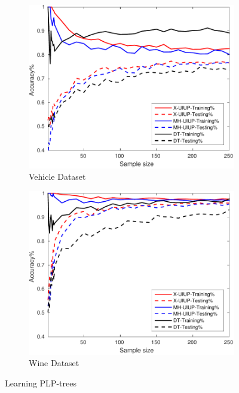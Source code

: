 \begin{figure}[ht]
\begin{subfigure}[b]{0.3\textwidth}
  	\includegraphics[width=\textwidth]{figs/PLPTF/Trees/VehicleDownsampledFurther_Trees_X_MH.pdf}
  	\caption{Vehicle Dataset}
		\label{fig:V1}
	\end{subfigure}
  \begin{subfigure}[b]{0.3\textwidth}
		\centering
  	\includegraphics[width=\textwidth]{figs/PLPTF/Trees/WineDownsampled_Trees_X_MH.pdf}
  	\caption{Wine Dataset}
		\label{fig:W1}
	\end{subfigure}

  \caption{Learning PLP-trees}
  \label{fig:trees1}
\end{figure}

